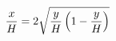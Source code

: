 \documentclass[preview]{standalone}
\begin{document}
\begin{align*}
\special{dvisvgm:raw <g id='unique000'>}\frac{x}{H} = 2 \sqrt{\frac{y}{H} \left( 1 - \frac{y}{H} \right)}\special{dvisvgm:raw </g>}
\end{align*}
\end{document}
